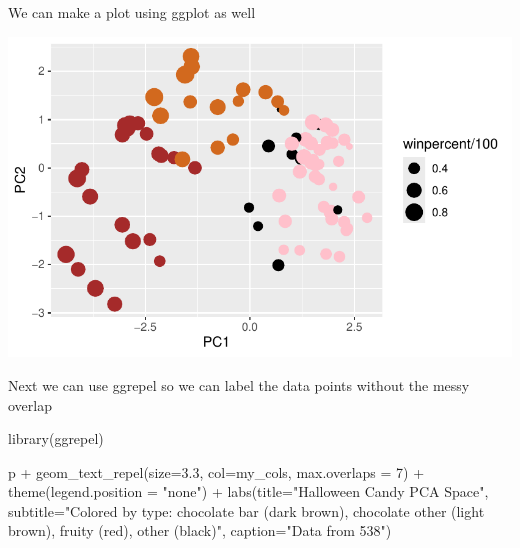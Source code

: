 \documentclass[
  letterpaper,
  DIV=11,
  numbers=noendperiod]{scrartcl}
\newenvironment{Shaded}{\begin{snugshade}}{\end{snugshade}}
\newcommand{\AttributeTok}[1]{\textcolor[rgb]{0.40,0.45,0.13}{#1}}
\newcommand{\DecValTok}[1]{\textcolor[rgb]{0.68,0.00,0.00}{#1}}
\newcommand{\FloatTok}[1]{\textcolor[rgb]{0.68,0.00,0.00}{#1}}
\newcommand{\FunctionTok}[1]{\textcolor[rgb]{0.28,0.35,0.67}{#1}}
\newcommand{\NormalTok}[1]{\textcolor[rgb]{0.00,0.23,0.31}{#1}}
\newcommand{\OtherTok}[1]{\textcolor[rgb]{0.00,0.23,0.31}{#1}}
\newcommand{\SpecialCharTok}[1]{\textcolor[rgb]{0.37,0.37,0.37}{#1}}
\newcommand{\StringTok}[1]{\textcolor[rgb]{0.13,0.47,0.30}{#1}}
\begin{document}
We can make a plot using ggplot as well

\begin{Shaded}
\end{Shaded}

\includegraphics{Class09_files/figure-pdf/unnamed-chunk-23-1.pdf}

Next we can use ggrepel so we can label the data points without the
messy overlap

\begin{Shaded}
\begin{Highlighting}[]
\FunctionTok{library}\NormalTok{(ggrepel)}

\NormalTok{p }\SpecialCharTok{+} \FunctionTok{geom\_text\_repel}\NormalTok{(}\AttributeTok{size=}\FloatTok{3.3}\NormalTok{, }\AttributeTok{col=}\NormalTok{my\_cols, }\AttributeTok{max.overlaps =} \DecValTok{7}\NormalTok{)  }\SpecialCharTok{+} 
  \FunctionTok{theme}\NormalTok{(}\AttributeTok{legend.position =} \StringTok{"none"}\NormalTok{) }\SpecialCharTok{+}
  \FunctionTok{labs}\NormalTok{(}\AttributeTok{title=}\StringTok{"Halloween Candy PCA Space"}\NormalTok{,}
       \AttributeTok{subtitle=}\StringTok{"Colored by type: chocolate bar (dark brown), chocolate other (light brown), fruity (red), other (black)"}\NormalTok{,}
       \AttributeTok{caption=}\StringTok{"Data from 538"}\NormalTok{)}
\end{Highlighting}
\end{Shaded}
\end{document}
